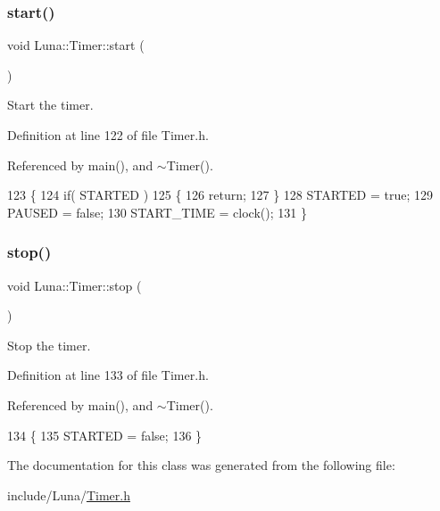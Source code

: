 \subsubsection{\texorpdfstring{start()}{start()}}
{\footnotesize\ttfamily void Luna\+::\+Timer\+::start (\begin{DoxyParamCaption}{ }\end{DoxyParamCaption})\hspace{0.3cm}{\ttfamily [inline]}}



Start the timer. 



Definition at line 122 of file Timer.\+h.



Referenced by main(), and $\sim$\+Timer().


\begin{DoxyCode}
123     \{
124         \textcolor{keywordflow}{if}( STARTED )
125         \{
126             \textcolor{keywordflow}{return};
127         \}
128         STARTED = \textcolor{keyword}{true};
129         PAUSED = \textcolor{keyword}{false};
130         START\_TIME = clock();
131     \}
\end{DoxyCode}
\mbox{\label{classLuna_1_1Timer_ad8ba9deb09bfe422cfaadba04a776662}} 
\subsubsection{\texorpdfstring{stop()}{stop()}}
{\footnotesize\ttfamily void Luna\+::\+Timer\+::stop (\begin{DoxyParamCaption}{ }\end{DoxyParamCaption})\hspace{0.3cm}{\ttfamily [inline]}}



Stop the timer. 



Definition at line 133 of file Timer.\+h.



Referenced by main(), and $\sim$\+Timer().


\begin{DoxyCode}
134     \{
135         STARTED = \textcolor{keyword}{false};
136     \}
\end{DoxyCode}


The documentation for this class was generated from the following file\+:\begin{DoxyCompactItemize}
\item 
include/\+Luna/\hyperlink{Timer_8h}{Timer.\+h}\end{DoxyCompactItemize}
